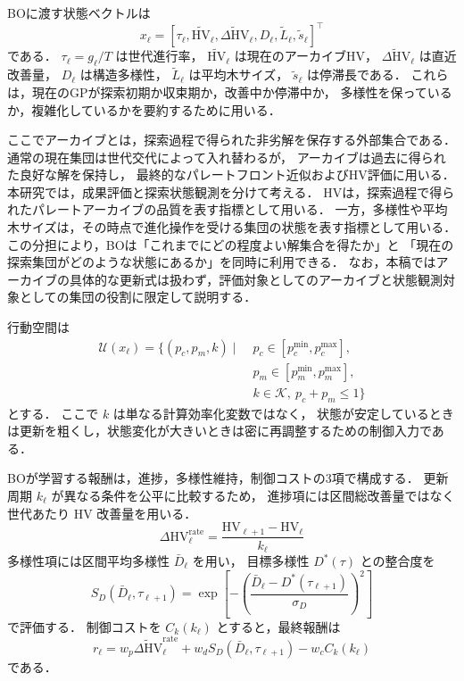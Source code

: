 \documentclass[a4paper,10pt,twocolumn]{ltjsarticle}
\newcommand{\HV}{\mathrm{HV}}
\begin{document}
BOに渡す状態ベクトルは
\begin{equation}
x_\ell =
\left[
\tau_\ell,
\widetilde{\HV}_\ell,
\widetilde{\Delta \HV}_\ell,
D_\ell,
\widetilde{L}_\ell,
\widetilde{s}_\ell
\right]^\top
\end{equation}
である．
\(\tau_\ell=g_\ell/T\) は世代進行率，
\(\widetilde{\HV}_\ell\) は現在のアーカイブHV，
\(\widetilde{\Delta \HV}_\ell\) は直近改善量，
\(D_\ell\) は構造多様性，
\(\widetilde{L}_\ell\) は平均木サイズ，
\(\widetilde{s}_\ell\) は停滞長である．
これらは，現在のGPが探索初期か収束期か，改善中か停滞中か，
多様性を保っているか，複雑化しているかを要約するために用いる．

ここでアーカイブとは，探索過程で得られた非劣解を保存する外部集合である．
通常の現在集団は世代交代によって入れ替わるが，
アーカイブは過去に得られた良好な解を保持し，
最終的なパレートフロント近似およびHV評価に用いる．
本研究では，成果評価と探索状態観測を分けて考える．
HVは，探索過程で得られたパレートアーカイブの品質を表す指標として用いる．
一方，多様性や平均木サイズは，その時点で進化操作を受ける集団の状態を表す指標として用いる．
この分担により，BOは「これまでにどの程度よい解集合を得たか」と
「現在の探索集団がどのような状態にあるか」を同時に利用できる．
なお，本稿ではアーカイブの具体的な更新式は扱わず，評価対象としてのアーカイブと状態観測対象としての集団の役割に限定して説明する．

行動空間は
\begin{equation}
\begin{aligned}
\mathcal{U}(x_\ell)=
\{(p_c,p_m,k)\mid\;&
p_c\in[p_c^{\min},p_c^{\max}],\\
&
p_m\in[p_m^{\min},p_m^{\max}],\\
&
k\in\mathcal{K},\ p_c+p_m\leq 1
\}
\end{aligned}
\end{equation}
とする．
ここで \(k\) は単なる計算効率化変数ではなく，
状態が安定しているときは更新を粗くし，状態変化が大きいときは密に再調整するための制御入力である．

BOが学習する報酬は，進捗，多様性維持，制御コストの3項で構成する．
更新周期 \(k_\ell\) が異なる条件を公平に比較するため，
進捗項には区間総改善量ではなく世代あたり HV 改善量を用いる．
\begin{equation}
\Delta\HV^{\mathrm{rate}}_\ell
=
\frac{\HV_{\ell+1}-\HV_\ell}{k_\ell}
\end{equation}
多様性項には区間平均多様性 \(\bar D_\ell\) を用い，
目標多様性 \(D^\ast(\tau)\) との整合度を
\begin{equation}
S_D(\bar D_\ell,\tau_{\ell+1})=
\exp\left[
-\left(
\frac{\bar D_\ell-D^\ast(\tau_{\ell+1})}{\sigma_D}
\right)^2
\right]
\end{equation}
で評価する．
制御コストを \(C_k(k_\ell)\) とすると，最終報酬は
\begin{equation}
r_\ell =
w_p\widetilde{\Delta\HV}^{\mathrm{rate}}_\ell
+w_dS_D(\bar D_\ell,\tau_{\ell+1})
-w_cC_k(k_\ell)
\end{equation}
である．
\end{document}
